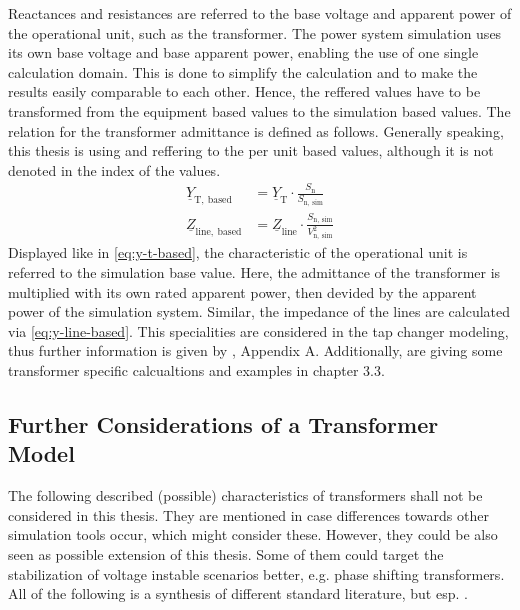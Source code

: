 Reactances and resistances are referred to the base voltage and apparent power of the operational unit, such as the transformer. 
The power system simulation uses its own base voltage and base apparent power, enabling the use of one single calculation domain. 
This is done to simplify the calculation and to make the results easily comparable to each other. 
Hence, the reffered values have to be transformed from the equipment based values to the simulation based values. 
The relation for the transformer admittance is defined as follows. 
Generally speaking, this thesis is using and reffering to the per unit based values, although it is not denoted in the index of the values.
\begin{align}
    \underline{Y}_\mathrm{T,~based}&=\underline{Y}_\mathrm{T} \cdot \frac{S_\mathrm{n}}{S_\mathrm{n,~sim}} \label{eq:y-t-based} \\[6pt]
    \underline{Z}_\mathrm{line,~based}&=\underline{Z}_\mathrm{line} \cdot \frac{S_\mathrm{n,~sim}}{V_\mathrm{n,~sim}^2} \label{eq:y-line-based}
\end{align}
Displayed like in \autoref{eq:y-t-based}, the characteristic of the operational unit is referred to the simulation base value. 
Here, the admittance of the transformer is multiplied with its own rated apparent power, then devided by the apparent power of the simulation system. 
Similar, the impedance of the lines are calculated via \autoref{eq:y-line-based}. 
This specialities are considered in the tap changer modeling, thus further information is given by \textcite{machowski_2020}, Appendix A.
Additionally, \textcite{glover_2017a} are giving some transformer specific calcualtions and examples in chapter 3.3.

\subsection{Further Considerations of a Transformer Model}
\label{sec:further-considerations}

The following described (possible) characteristics of transformers shall not be considered in this thesis.
They are mentioned in case differences towards other simulation tools occur, which might consider these.
However, they could be also seen as possible extension of this thesis.
Some of them could target the stabilization of voltage instable scenarios better, e.g. phase shifting transformers. 
All of the following is a synthesis of different standard literature, but esp. \autocite{schwab_2022,oeding_2016,machowski_2020,kundur_2022}.

